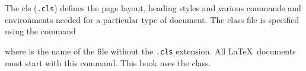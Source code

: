 The \gls*{cls} (\texttt{.cls}) defines the page layout, heading
styles and various \glspl{command} and \glspl{environment} needed for a
particular type of document.  The class file is specified using the
command
\begin{definition}
\end{definition}%
where  is the name of the
file without the \texttt{.cls} extension.  All \LaTeX\ documents
must start with this command. This book uses the
 class.
